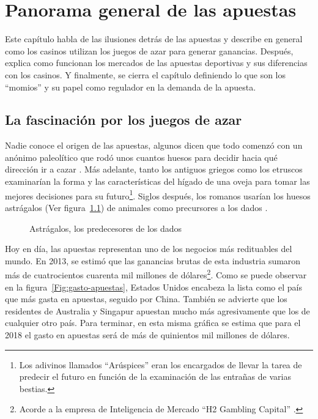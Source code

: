 \graphicspath{{/Users/brunomedina/Dropbox/Tesis-Egobets/egobets-notas/resources/marco/}}
\chapter{Panorama general de las apuestas}
\label{chap:general}

Este capítulo habla de las ilusiones detrás de las apuestas y describe en general como los casinos utilizan los juegos de azar para generar ganancias. Después, explica como funcionan los mercados de las apuestas deportivas y sus diferencias con los casinos. Y finalmente, se cierra el capítulo definiendo lo que son los ``momios'' y su papel como regulador en la demanda de la apuesta. 

 \section{La fascinación por los juegos de azar}
 \label{sec:fascinacion}
 

Nadie conoce el origen de las apuestas, algunos dicen que todo comenzó con un anónimo paleolítico que rodó unos cuantos huesos para decidir hacia qué dirección ir a cazar \cite{schwartz2013roll}. Más adelante, tanto los antiguos griegos como los etruscos examinarían la forma y las características del hígado de una oveja para tomar las mejores decisiones para su futuro\footnote{Los adivinos llamados ``Arúspices'' eran los encargados de llevar la tarea de predecir el futuro en función de la examinación de las entrañas de varias bestias.}. Siglos después, los romanos usarían los huesos astrágalos (Ver figura~\ref{Fig:huesos}) de animales como precursores a los dados \cite{schwartz2013roll}.

\begin{figure}[!htb]\centering
   \begin {minipage}{0.85\textwidth}
     \caption{Astrágalos, los predecesores de los dados}\label{Fig:huesos}
   \end{minipage}
\end{figure}

Hoy en día, las apuestas representan uno de los negocios más redituables del mundo. En 2013, se estimó que las ganancias brutas de esta industria sumaron más de cuatrocientos cuarenta mil millones de dólares\footnote{Acorde a la empresa de Inteligencia de Mercado ``H2 Gambling Capital'' \cite{economistHouseWins}.}. Como se puede observar en la figura~\ref{Fig:gasto-apuestas}, Estados Unidos encabeza la lista como el país que más gasta en apuestas, seguido por China. También se advierte que los residentes de Australia y Singapur apuestan mucho más agresivamente que los de cualquier otro país. Para terminar, en esta misma gráfica se estima que para el 2018 el gasto en apuestas será de más de quinientos mil millones de dólares.


